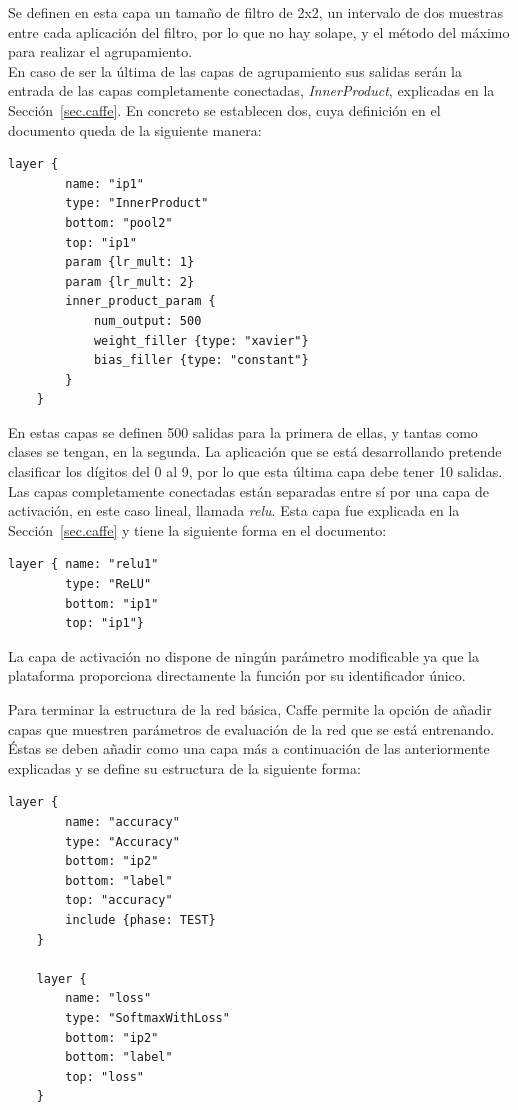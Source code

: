 	Se definen en esta capa un tamaño de filtro de 2x2, un intervalo de dos muestras entre cada aplicación del filtro, por lo que no hay solape, y el método del máximo para realizar el agrupamiento.\\

	En caso de ser la última de las capas de agrupamiento sus salidas serán la entrada de las capas completamente conectadas, \textit{InnerProduct}, explicadas en la Sección~\ref{sec.caffe}. En concreto se establecen dos, cuya definición en el documento queda de la siguiente manera:\\
	\vspace{-10pt}
	
	\begin{lstlisting}[frame=single]
	layer {
		name: "ip1"
		type: "InnerProduct"
		bottom: "pool2"
		top: "ip1"
		param {lr_mult: 1}
		param {lr_mult: 2}
		inner_product_param {
			num_output: 500
			weight_filler {type: "xavier"}
			bias_filler {type: "constant"}
		}
	}	
	\end{lstlisting}
	
	En estas capas se definen 500 salidas para la primera de ellas, y tantas como clases se tengan, en la segunda. La aplicación que se está desarrollando pretende clasificar los dígitos del 0 al 9, por lo que esta última capa debe tener 10 salidas.\\

	Las capas completamente conectadas están separadas entre sí por una capa de activación, en este caso lineal, llamada \textit{\acrshort{relu}}. Esta capa fue explicada en la Sección~\ref{sec.caffe} y tiene la siguiente forma en el documento:
	\vspace{10pt}
	\begin{lstlisting}[frame=single]
	layer { name: "relu1"
		type: "ReLU"
		bottom: "ip1"
		top: "ip1"}	
	\end{lstlisting}
	
	La capa de activación no dispone de ningún parámetro modificable ya que la plataforma proporciona directamente la función por su identificador único.\\
	\vspace{10pt}
	
	Para terminar la estructura de la red básica, Caffe permite la opción de añadir capas que muestren parámetros de evaluación de la red que se está entrenando. Éstas se deben añadir como una capa más a continuación de las anteriormente explicadas y se define su estructura de la siguiente forma:
	\vspace{10pt}
	\begin{lstlisting}[frame=single]
	layer {
		name: "accuracy"
		type: "Accuracy"
		bottom: "ip2"
		bottom: "label"
		top: "accuracy"
		include {phase: TEST}
	}
	
	layer {
		name: "loss"
		type: "SoftmaxWithLoss"
		bottom: "ip2"
		bottom: "label"
		top: "loss"
	}	
	\end{lstlisting}
	
